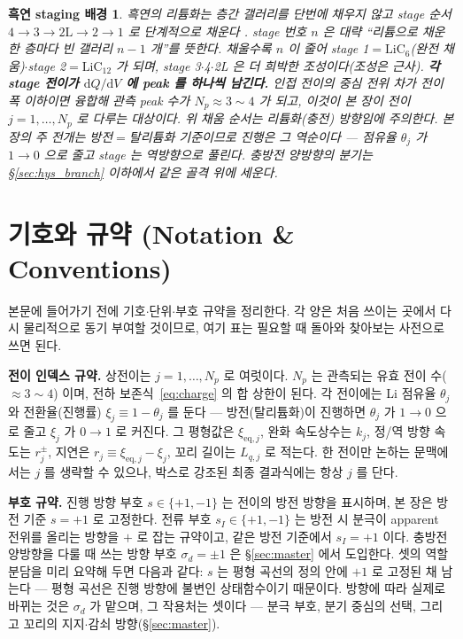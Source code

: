 \documentclass[11pt,a4paper]{article}
\newtheorem*{stagebox}{흑연 staging 배경}
\newcommand{\dd}{\mathrm{d}}
\newcommand{\eq}{\mathrm{eq}}
\begin{document}
\begin{stagebox}
흑연의 리튬화는 층간 갤러리를 단번에 채우지 않고 \emph{stage} 순서 $4\to3\to2\mathrm L\to2\to1$ 로 단계적으로
채운다 \cite{dahn1991,ohzuku1993}. stage 번호 $n$ 은 대략 ``리튬으로 채운 한 층마다 빈 갤러리 $n-1$ 개''를 뜻한다.
채울수록 $n$ 이 줄어 stage 1$=\mathrm{LiC_6}$(완전 채움)$\cdot$stage 2$=\mathrm{LiC_{12}}$ 가 되며, stage
3$\cdot$4$\cdot$2L 은 더 희박한 조성이다(조성은 근사). \textbf{각 stage 전이가 $\dd Q/\dd V$ 에 peak 를 하나씩
남긴다.} 인접 전이의 중심 전위 차가 전이폭 이하이면 융합해 관측 peak 수가 $N_p\approx3\sim4$ 가 되고, 이것이 본
장이 전이 $j=1,\dots,N_p$ 로 다루는 대상이다. 위 채움 순서는 \emph{리튬화(충전)} 방향임에 주의한다. 본 장의 주
전개는 \emph{방전}$=$탈리튬화 기준이므로 진행은 그 역순이다 — 점유율 $\theta_j$ 가 $1\to0$ 으로 줄고 stage 는
역방향으로 풀린다. 충방전 양방향의 분기는 \S\ref{sec:hys_branch} 이하에서 같은 골격 위에 세운다.
\end{stagebox}

\tableofcontents
\newpage

\section{기호와 규약 (Notation \& Conventions)}\label{sec:notation}
본문에 들어가기 전에 기호$\cdot$단위$\cdot$부호 규약을 정리한다. 각 양은 처음 쓰이는 곳에서 다시 물리적으로
동기 부여할 것이므로, 여기 표는 필요할 때 돌아와 찾아보는 사전으로 쓰면 된다.

\textbf{전이 인덱스 규약.} 상전이는 $j=1,\dots,N_p$ 로 여럿이다. $N_p$ 는 관측되는 유효 전이 수($\approx3\sim4$)
이며, 전하 보존식~\eqref{eq:charge} 의 합 상한이 된다. 각 전이에는 Li 점유율 $\theta_j$ 와 전환율(진행률)
$\xi_j\equiv1-\theta_j$ 를 둔다 — 방전(탈리튬화)이 진행하면 $\theta_j$ 가 $1\to0$ 으로 줄고 $\xi_j$ 가 $0\to1$
로 커진다. 그 평형값은 $\xi_{\eq,j}$, 완화 속도상수는 $k_j$, 정/역 방향 속도는 $r_j^\pm$, 지연은
$r_j\equiv\xi_{\eq,j}-\xi_j$, 꼬리 길이는 $L_{q,j}$ 로 적는다. 한 전이만 논하는 문맥에서는 $j$ 를 생략할 수
있으나, 박스로 강조된 최종 결과식에는 항상 $j$ 를 단다.

\textbf{부호 규약.} 진행 방향 부호 $s\in\{+1,-1\}$ 는 전이의 방전 방향을 표시하며, 본 장은 방전 기준 $s=+1$ 로
고정한다. 전류 부호 $s_I\in\{+1,-1\}$ 는 방전 시 분극이 apparent 전위를 올리는 방향을 $+$ 로 잡는 규약이고, 같은
방전 기준에서 $s_I=+1$ 이다. 충방전 양방향을 다룰 때 쓰는 방향 부호 $\sigma_d=\pm1$ 은 \S\ref{sec:master} 에서
도입한다. 셋의 역할 분담을 미리 요약해 두면 다음과 같다: $s$ 는 평형 곡선의 정의 안에 $+1$ 로 고정된 채 남는다 —
평형 곡선은 진행 방향에 불변인 상태함수이기 때문이다. 방향에 따라 실제로 바뀌는 것은 $\sigma_d$ 가 맡으며, 그
작용처는 셋이다 — 분극 부호, 분기 중심의 선택, 그리고 꼬리의 지지$\cdot$감쇠 방향(\S\ref{sec:master}).
\end{document}
